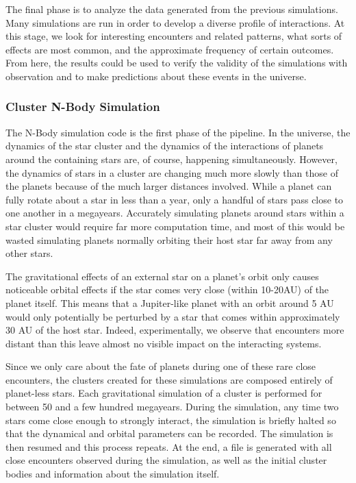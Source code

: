\documentclass[12pt]{article}
\begin{document}
    The final phase is to analyze the data generated from the previous simulations.
    Many simulations are run in order to develop a diverse profile of interactions.
    At this stage, we look for interesting encounters and related patterns, 
    what sorts of effects are most common,
    and the approximate frequency of certain outcomes. From here, the results could
    be used to verify the validity of the simulations with observation and to make
    predictions about these events in the universe.


    \subsubsection{Cluster N-Body Simulation}

    The N-Body simulation code is the first phase of the pipeline. In the
    universe, the dynamics of the star cluster and the dynamics of the
    interactions of planets around the containing stars are, of course, happening
    simultaneously. However, the dynamics of stars in a cluster are changing much
    more slowly than those of the planets because of the much larger distances
    involved. While a planet can fully rotate about a star in less than a year,
    only a handful of stars pass close to one another in a megayears. Accurately
    simulating planets around stars within a star cluster would require
    far more computation time, and most of this would be wasted simulating
    planets normally orbiting their host star far away from any other stars.

    The gravitational effects of an external star on a planet's orbit only
    causes noticeable orbital effects if the star comes very close (within 10-20AU)
    of the planet itself. This means that a Jupiter-like planet with an orbit around
    5 AU would only potentially be perturbed by a star that comes within 
    approximately 30 AU of the host star. Indeed, experimentally, we observe that
    encounters more distant than this leave almost no visible impact on the
    interacting systems. 

    Since we only care about the fate of planets during one of these 
    rare close encounters,
    the clusters created for these simulations are composed entirely of planet-less stars.
    Each gravitational simulation of a cluster is performed for between 50 
    and a few hundred megayears. During the simulation, any time two stars
    come close enough to strongly interact, the simulation is briefly halted so that
    the dynamical and orbital parameters can be recorded. The simulation is then
    resumed and this process repeats. At the end, a file is generated with
    all close encounters observed during the simulation, as well as the initial
    cluster bodies and information about the simulation itself.
\end{document}
